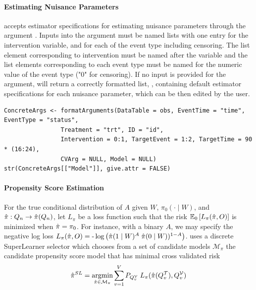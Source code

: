 \documentclass{report}
\DeclareMathOperator*{\argmin}{argmin}
\newcommand{\1}{\ensuremath{\mathbf{1}}}
\newcommand{\X}{\ensuremath{{W}}}
\newcommand{\g}{\ensuremath{\pi}}
\begin{document}
\paragraph{Estimating Nuisance Parameters}
\label{NuisanceEstimation}
 accepts estimator specifications for estimating nuisance parameters through the argument . Inputs into the  argument must be named lists with one entry for the intervention variable, and for each of the event type including censoring. The list element corresponding to intervention must be named after the variable and the list elements corresponding to each event type must be named for the numeric value of the event type ("0" for censoring). If no input is provided for the  argument,  will return a correctly formatted list, , containing default estimator specifications for each nuisance parameter, which can be then edited by the user.

\begin{lstlisting}
ConcreteArgs <- formatArguments(DataTable = obs, EventTime = "time", EventType = "status", 
				Treatment = "trt", ID = "id", 
				Intervention = 0:1, TargetEvent = 1:2, TargetTime = 90 * (16:24), 
				CVArg = NULL, Model = NULL)
str(ConcreteArgs[["Model"]], give.attr = FALSE)
\end{lstlisting}

\paragraph{Propensity Score Estimation}
\label{PropScore}
For the true conditional distribution of \(A\) given \(\X\), \(\g_0(\cdot \mid \X)\), and \(\Hat{\g} : Q_n \to \Hat{\g}(Q_n)\), let \(L_\g\) be a loss function such that the risk \(\mathbb{E}_0\left[L_\g(\Hat{\g}, O)\right]\) is minimized when \(\Hat{\g} = \g_0\). For instance, with a binary \(A\), we may specify the negative log loss \(L_\g(\Hat{\g}, O) = \text{-}\log\left(\Hat{\g}(1 \mid \X)^A \; \Hat{\g}(0 \mid \X))^{1-A}\right)\).  uses a discrete SuperLearner selector which chooses from a set of candidate models \(\mathcal{M_\g}\) the candidate propensity score model that has minimal cross validated risk 
\[ \Hat{\g}^{SL} = \argmin_{\Hat{\g} \in \mathcal{M}_\g} \sum_{v = 1}^{V} P_{Q^\mathcal{V}_v} \; L_\g(\Hat{\g}(Q^\mathcal{T}_v), Q^\mathcal{V}_v)\]
\end{document}
